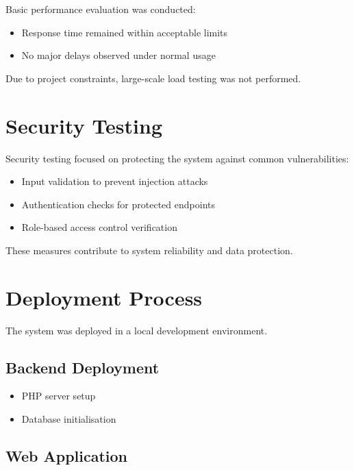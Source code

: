 Basic performance evaluation was conducted:

\begin{itemize}[noitemsep]
    \item Response time remained within acceptable limits
    \item No major delays observed under normal usage
\end{itemize}

Due to project constraints, large-scale load testing was not performed.

\section{Security Testing}

Security testing focused on protecting the system against common vulnerabilities:

\begin{itemize}[noitemsep]
    \item Input validation to prevent injection attacks
    \item Authentication checks for protected endpoints
    \item Role-based access control verification
\end{itemize}

These measures contribute to system reliability and data protection.

\section{Deployment Process}

The system was deployed in a local development environment.

\subsection{Backend Deployment}

\begin{itemize}[noitemsep]
    \item PHP server setup
    \item Database initialisation
\end{itemize}

\subsection{Web Application}

